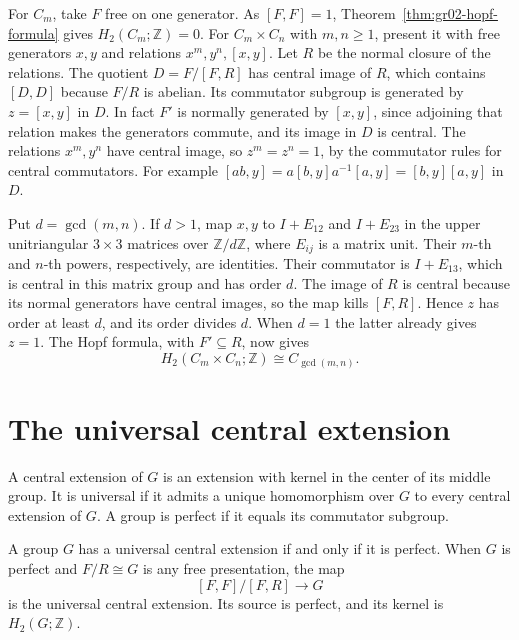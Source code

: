 \begin{example}
\label{ex:gr02-multiplier-cyclic-product}
For \(C_m\), take \(F\) free on one generator. As \([F,F]=1\),
Theorem~\ref{thm:gr02-hopf-formula} gives \(H_2(C_m;\mathbb Z)=0\).
For \(C_m\times C_n\) with \(m,n\geq 1\), present it with free
generators \(x,y\) and relations \(x^m,y^n,[x,y]\). Let \(R\)
be the normal closure of the relations. The quotient
\(D=F/[F,R]\) has central image of \(R\), which contains
\([D,D]\) because \(F/R\) is abelian. Its commutator subgroup is
generated by \(z=[x,y]\) in \(D\). In fact \(F'\) is normally
generated by \([x,y]\), since adjoining that relation makes
the generators commute, and its image in \(D\) is central.
The relations \(x^m,y^n\) have central image, so
\(z^m=z^n=1\), by the commutator rules for central commutators.
For example \([ab,y]=a[b,y]a^{-1}[a,y]=[b,y][a,y]\) in \(D\).

Put \(d=\gcd(m,n)\). If \(d>1\), map \(x,y\) to \(I+E_{12}\)
and \(I+E_{23}\) in the upper unitriangular \(3\times3\) matrices
over \(\mathbb Z/d\mathbb Z\), where \(E_{ij}\) is a matrix unit.
Their \(m\)-th and \(n\)-th powers, respectively, are identities.
Their commutator is \(I+E_{13}\), which is central in this matrix
group and has order \(d\). The image of \(R\) is central because
its normal generators have central images, so the map kills
\([F,R]\). Hence \(z\) has order at least \(d\), and its order
divides \(d\). When \(d=1\) the latter already gives \(z=1\).
The Hopf formula, with \(F'\subseteq R\), now gives
\[
          H_2(C_m\times C_n;\mathbb Z)\cong C_{\gcd(m,n)} .
\]
\end{example}

\section{The universal central extension}

A central extension of \(G\) is an extension with kernel
in the center of its middle group. It is universal if it
admits a unique homomorphism over \(G\) to every central
extension of \(G\). A group is perfect if it equals its
commutator subgroup.

\begin{theorem}
\label{thm:gr02-universal-central-extension}
A group \(G\) has a universal central extension if and only if
it is perfect. When \(G\) is perfect and \(F/R\cong G\) is any
free presentation, the map
\[
       [F,F]/[F,R]\longrightarrow G
\]
is the universal central extension. Its source is perfect,
and its kernel is \(H_2(G;\mathbb Z)\).
\end{theorem}

